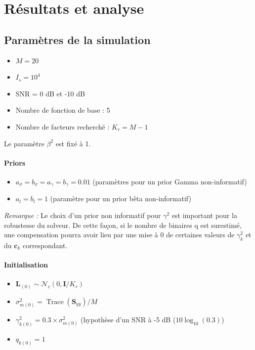 \documentclass[ 12pt]{article}
\newcommand{\tr}[1]{\operatorname{Trace}\!\left(#1\right)}
\begin{document}
\section{Résultats et analyse}
\subsection{Paramètres de la simulation}

\begin{itemize}
        \item $M=20$
        \item $I_s = 10^4$
        \item SNR = 0 dB et -10 dB
        \item Nombre de fonction de base : 5
        \item Nombre de facteurs recherché : $K_r= M-1$  
\end{itemize}
Le paramètre $\beta^2$ est fixé à 1.

\paragraph{Priors}
\begin{itemize}
        \item $a_\sigma = b_\sigma = a_\gamma = b_\gamma = 0.01$ (paramètres pour un prior Gamma non-informatif)
        \item $a_l = b_l = 1$ (paramètre pour un prior bêta non-informatif)
\end{itemize}
\textit{Remarque : }Le choix d'un prior non informatif pour $\gamma^2$ est important pour la robustesse du solveur. De cette façon, si le nombre de binaires q est surestimé, une compensation pourra avoir lieu par une mise à 0 de certaines valeurs de $\gamma^2_k$ et du $\bm{c}_k$ correspondant.

\paragraph{Initialisation}
\begin{itemize}
        \item $\bm{L}_{(0)} \sim \mathcal{N}_c(0,\bm{I}/K_r)$
	\item $\sigma_{m(0)}^2=\tr{\bm{S}_{yy}}/M$
        \item  $\gamma_{k(0)}^2=0.3 \times \sigma_{m(0)}^2$ (hypothèse d'un SNR à -5 dB ($10\log_{10}(0.3)$)
        \item $q_{k(0)}=1$ 
\end{itemize}
\end{document}
